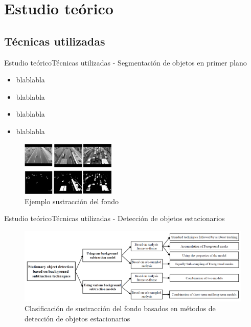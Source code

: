 \section{Estudio teórico}

\subsection{Técnicas utilizadas}

\begin{frame}{Estudio teórico}{Técnicas utilizadas - Segmentación de objetos en primer plano}

\begin{itemize}
    \item blablabla
    \item blablabla
    \item blablabla
    \item blablabla
\end{itemize}


\begin{figure}[ht]
\centering
\includegraphics[width=0.4\textwidth]{Images/estudio-teorico/background-subtraction-example.jpg}
\caption{\label{fig:background-subtraction-example}Ejemplo sustracción del fondo}
\end{figure}

\end{frame}


\begin{frame}{Estudio teórico}{Técnicas utilizadas - Detección de objetos estacionarios}

\begin{figure}[ht]
\centering
\includegraphics[width=1\textwidth]{Images/estudio-teorico/metodos-sustraccion-fondo-deteccion-fondo-estacionario.png}
\caption{\label{fig:metodos-sustraccion-fondo-deteccion-fondo-estacionario}Clasificación de sustracción del fondo basados en métodos de detección de objetos estacionarios}
\end{figure}

\end{frame}

